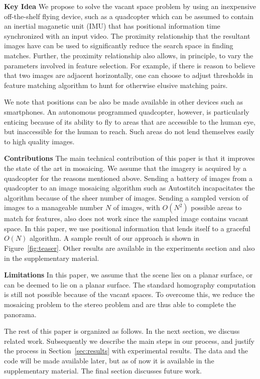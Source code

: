 \documentclass[10pt,twocolumn,letterpaper]{article}
\begin{document}
{\bf Key Idea} We propose to solve the vacant space problem by using
an inexpensive off-the-shelf flying device, such as a quadcopter which
can be assumed to contain an inertial maganetic unit (IMU) that has
positional information time synchronized with an input video.  The
proximity relationship that the resultant images have can be used to
significantly reduce the search space in finding matches.  Further,
the proximity relationship also allows, in principle, to vary the
parameters involved in feature selection. For example, if there is
reason to believe that two images are adjacent horizontally, one can
choose to adjust thresholds in feature matching algorithm to hunt for
otherwise elusive matching pairs.

We note that positions can be also be made available in other devices
such as smartphones.  An autonomous programmed quadcopter, however, is
particularly enticing because of its ability to fly to areas that are
accessible to the human eye, but inaccessible for the
human to reach.  Such areas do not lend themselves easily to high
quality images.


{\bf Contributions} The main technical contribution of this paper is
that it improves the state of the art in mosaicing.  We assume that
the imagery is acquired by a quadcopter for the reasons mentioned
above. Sending a battery of images from a quadcopter to an image
mosaicing algorithm such as Autostitch
incapacitates the algorithm because of the sheer number of
images. Sending a sampled version of images to a manageable number $N$
of images, with $O(N^2)$ possible areas to match for features, also
does not work since the sampled image contains vacant space.  In this
paper, we use positional information that lends itself to a graceful
$O(N)$ algorithm.  A sample result of our approach is shown in
Figure~\ref{fig:teaser}.  Other results are available in the
experiments section and also in the supplementary material.

{\bf Limitations} In this paper, we assume that the
scene lies on a planar surface, or can be deemed to lie on a planar surface. The
standard homography computation is still not possible because of the
vacant spaces. To overcome this, we reduce the mosaicing problem to
the stereo problem and are thus able to complete the panorama.


The rest of this paper is organized as follows.  In the next section,
we discuss related work.  Subsequently we describe the main steps in
our process, and justify the process in Section~\ref{sec:results} with
experimental results.  The data and the code will be made available
later, but as of now it is available in the supplementary material.
The final section discusses future work.
\end{document}
